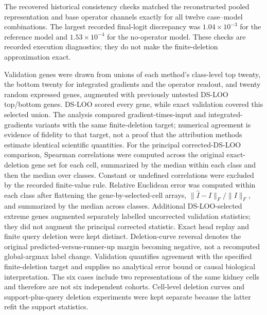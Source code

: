 The recovered historical consistency checks matched the reconstructed pooled representation and base operator channels exactly for all twelve case--model combinations. The largest recorded final-logit discrepancy was $1.04\times10^{-3}$ for the reference model and $1.53\times10^{-4}$ for the no-operator model. These checks are recorded execution diagnostics; they do not make the finite-deletion approximation exact.

Validation genes were drawn from unions of each method's class-level top twenty, the bottom twenty for integrated gradients and the operator readout, and twenty random expressed genes, augmented with previously untested DS-LOO top/bottom genes. DS-LOO scored every gene, while exact validation covered this selected union. The analysis compared gradient-times-input and integrated-gradients variants\cite{sundararajan2017ig} with the same finite-deletion target; numerical agreement is evidence of fidelity to that target, not a proof that the attribution methods estimate identical scientific quantities. For the principal corrected-DS-LOO comparison, Spearman correlations were computed across the original exact-deletion gene set for each cell, summarized by the median within each class and then the median over classes. Constant or undefined correlations were excluded by the recorded finite-value rule. Relative Euclidean error was computed within each class after flattening the gene-by-selected-cell arrays, $\|\widehat I-I\|_F/\|I\|_F$, and summarized by the median across classes. Additional DS-LOO-selected extreme genes augmented separately labelled uncorrected validation statistics; they did not augment the principal corrected statistic. Exact head replay and finite query deletion were kept distinct. Deletion-curve reversal denotes the original predicted-versus-runner-up margin becoming negative, not a recomputed global-argmax label change. Validation quantifies agreement with the specified finite-deletion target and supplies no analytical error bound or causal biological interpretation. The six cases include two representations of the same kidney cells and therefore are not six independent cohorts. Cell-level deletion curves and support-plus-query deletion experiments were kept separate because the latter refit the support statistics.
